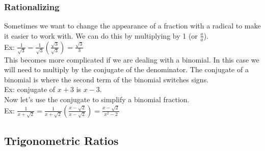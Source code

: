 \documentclass[11pt, fleqn]{article}
\begin{document}
\subsubsection{Rationalizing}
Sometimes we want to change the appearance of a fraction with a radical to make it easier to work with. We can do this by multiplying by 1 (or $\frac{a}{a}$).\\
Ex: $\frac{1}{\sqrt{3}}=\frac{1}{\sqrt{3}}\left(\frac{\sqrt{3}}{\sqrt{3}}\right)=\frac{\sqrt{3}}{3}$\\
This becomes more complicated if we are dealing with a binomial. In this case we will need to multiply by the conjugate of the denominator. The conjugate of a binomial is where the second term of the binomial switches signs.\\
Ex: conjugate of $x+3$ is $x-3$.\\
Now let's use the conjugate to simplify a binomial fraction.\\
Ex: $\frac{1}{x+\sqrt{2}}=\frac{1}{x+\sqrt{2}}\left(\frac{x-\sqrt{2}}{x-\sqrt{2}}\right)=\frac{x-\sqrt{2}}{x^2-2}$







\subsection{Trigonometric Ratios}
\end{document}
